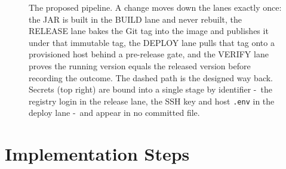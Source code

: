 \documentclass[10pt,a4paper]{article}
\begin{document}
\begin{figure}[h]
{}
\caption{The proposed pipeline. A change moves down the lanes exactly once: the JAR is built in
the BUILD lane and never rebuilt, the RELEASE lane bakes the Git tag into the image and
publishes it under that immutable tag, the DEPLOY lane pulls that tag onto a provisioned host
behind a pre-release gate, and the VERIFY lane proves the running version equals the released
version before recording the outcome. The dashed path is the designed way back. Secrets (top
right) are bound into a single stage by identifier -\ the registry login in the release
lane, the SSH key and host \texttt{.env} in the deploy lane -\ and appear in no
committed file.}
\end{figure}

\newpage

\section{Implementation Steps}
\end{document}
